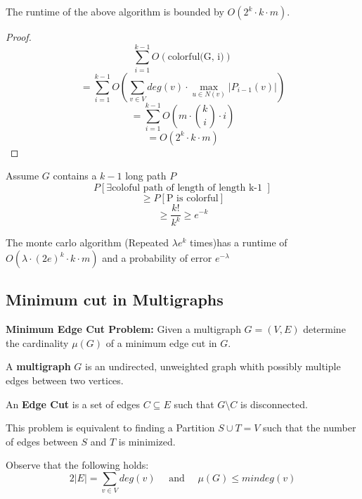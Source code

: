 \begin{theorem}
	The runtime of the above algorithm is bounded by $O(2^k \cdot k \cdot m)$.
\end{theorem}

\begin{proof}
	$$\sum_{i=1}^{k-1} O(\text{colorful(G, i)})$$
	$$ = \sum_{i=1}^{k-1} O(\sum_{v \in V} deg(v) \cdot \max_{u \in N(v)} |P_{i-1}(v)|)$$
	$$ = \sum_{i=1}^{k-1} O(m \cdot \binom{k}{i} \cdot i)$$
	$$ = O(2^k  \cdot k \cdot m)$$
\end{proof}

\begin{remark}
	Assume $G$ contains a $k-1$ long path $P$
	$$P[\exists \text{coloful path of length of length k-1 }]$$
	$$ \geq P[ \text{P is colorful} ]$$
	$$ \geq \frac{k!}{k^k} \geq e^{-k}$$
\end{remark}

\begin{theorem}
	The monte carlo algorithm (Repeated $\lambda e^k$ times)has a runtime of $O(\lambda \cdot (2e)^k \cdot k \cdot m)$ and a probability of error $e^{-\lambda}$
\end{theorem}

\subsection{Minimum cut in Multigraphs}

\begin{definition}
	\textbf{Minimum Edge Cut Problem: } Given a multigraph $G=(V,E)$ determine the cardinality $\mu(G)$ of a minimum edge cut in $G$.
\end{definition}

\begin{definition}
	A \textbf{multigraph} $G$ is an undirected, unweighted graph whith possibly multiple edges between two vertices.
\end{definition}

\begin{definition}
	An \textbf{Edge Cut} is a set of edges $C \subseteq E$ such that $G \setminus C$ is disconnected.
\end{definition}

\begin{remark}
	This problem is equivalent to finding a Partition $S \cup T = V$ such that the number of edges between $S$ and $T$ is minimized.
\end{remark}

\begin{lemma}
	Observe that the following holds:
	$$2 |E| = \sum_{v \in V} deg(v) \quad \text{ and } \quad \mu(G) \leq mindeg(v)$$
\end{lemma}

